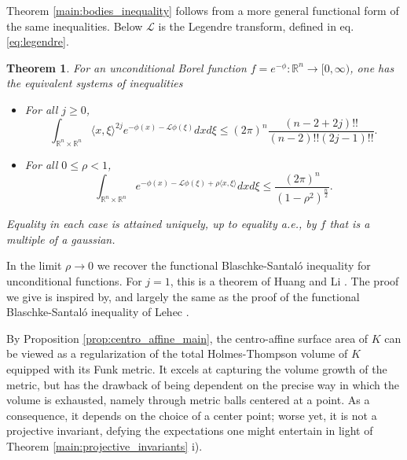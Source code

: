 \documentclass[reqno,10pt]{amsart}
\newcounter{mt}
\newcounter{mp}
\newtheorem{MainTheorem}[mt]{Theorem}
\newcommand{\R}{\mathbb{R}}
\begin{document}
Theorem \ref{main:bodies_inequality} follows from a more general functional form of the same inequalities. Below $\mathcal L$ is the Legendre transform, defined in eq. \eqref{eq:legendre}.
\begin{MainTheorem}\label{main:inequality_functional}
	For an unconditional Borel function $f=e^{-\phi}:\R^n\to[0,\infty)$, one has  the equivalent systems of inequalities
	\begin{itemize}
		\item For all $j\geq 0$, $$\int_{\R^n\times\R^n}\langle x,\xi\rangle ^{2j}e^{-\phi(x)-\mathcal L\phi(\xi)}dx d\xi\leq (2\pi)^n \frac{(n-2+2j)!!}{(n-2)!!(2j-1)!!}.$$
		\item For all $0\leq \rho<1$, $$\int_{\R^n\times\R^n}e^{-\phi(x)-\mathcal L \phi (\xi)+\rho\langle x,\xi\rangle}dxd\xi\leq \frac{(2\pi)^n}{(1-\rho^2)^{\frac n 2}}.$$
	\end{itemize}
	Equality in each case is attained uniquely, up to equality a.e., by $f$ that is a multiple of a gaussian.
\end{MainTheorem}
In the limit $\rho\to0$ we recover the functional Blaschke-Santal\'o inequality for unconditional functions. For $j=1$, this is a theorem of Huang and Li \cite{huang_li}. The proof we give is inspired by, and largely the same as the proof of the functional Blaschke-Santal\'o inequality of Lehec \cite{lehec}. 


%

By Proposition \ref{prop:centro_affine_main}, the centro-affine surface area of $K$ can be viewed as a regularization of the total Holmes-Thompson volume of $K$ equipped with its Funk metric. It excels at capturing the volume growth of the metric, but has the drawback of being dependent on the precise way in which the volume is exhausted, namely through metric balls centered at a point. As a consequence, it depends on the choice of a center point; worse yet, it is not a projective invariant, defying the expectations one might entertain in light of Theorem \ref{main:projective_invariants} i). 
\end{document}
